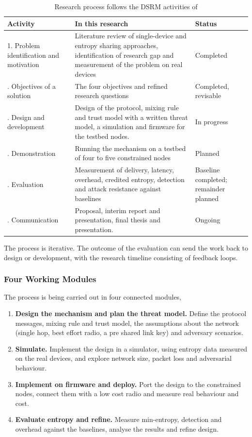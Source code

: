 \documentclass[a4paper, 12pt]{article}
\begin{document}
\begin{table}[htbp]
\centering
\small
\caption{Research process follows the DSRM activities of \citet{peffers2007dsrm}}
\label{tab:meth_dsrm}
\begin{tabularx}{\textwidth}{@{}p{}Xp{}@{}}
\toprule
\textbf{Activity} & \textbf{In this research} & \textbf{Status} \\
\midrule
1. Problem identification and motivation & Literature review of single-device and entropy sharing approaches, identification of research gap and measurement of the problem on real devices & Completed \\
\addlinespace
2. Objectives of a solution & The four objectives and refined research questions & Completed, revisable \\
\addlinespace
3. Design and development & Design of the protocol, mixing rule and trust model with a written threat model, a simulation and firmware for the testbed nodes. & In progress \\
\addlinespace
4. Demonstration & Running the mechanism on a testbed of four to five constrained nodes & Planned \\
\addlinespace
5. Evaluation & Measurement of delivery, latency, overhead, credited entropy, detection and attack resistance against baselines & Baseline completed; remainder planned \\
\addlinespace
6. Communication & Proposal, interim report and presentation, final thesis and presentation. & Ongoing \\
\bottomrule
\end{tabularx}
\end{table}
 
The process is iterative. The outcome of the evaluation can send the work back to design or development, with the research timeline consisting of feedback loops.
 
\subsubsection{Four Working Modules}
 
The process is being carried out in four connected modules,
 
\begin{enumerate}
    \item \textbf{Design the mechanism and plan the threat model.} Define the protocol messages, mixing rule and trust model, the assumptions about the network (single hop, best effort radio, a pre shared link key) and adversary scenarios.
    \item \textbf{Simulate.} Implement the design in a simulator, using entropy data measured on the real devices, and explore network size, packet loss and adversarial behaviour.
    \item \textbf{Implement on firmware and deploy.} Port the design to the constrained nodes, connect them with a low cost radio and measure real behaviour and cost.
    \item \textbf{Evaluate entropy and refine.} Measure min-entropy, detection and overhead against the baselines, analyse the results and refine design.
\end{enumerate}
 
\end{document}
